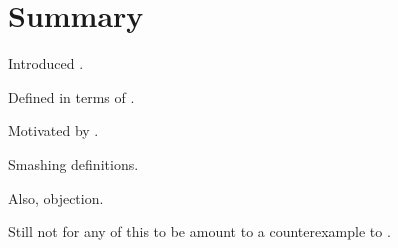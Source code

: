 \section*{Summary}

\begin{note}
  Introduced .

  Defined in terms of \tC{}.

  Motivated by \tC{}.
\end{note}

\begin{note}
  Smashing definitions.
\end{note}

\begin{note}
  Also, objection.
\end{note}

\begin{note}
  Still not  for any of this to be amount to a counterexample to \issueConstraint{}.
\end{note}











